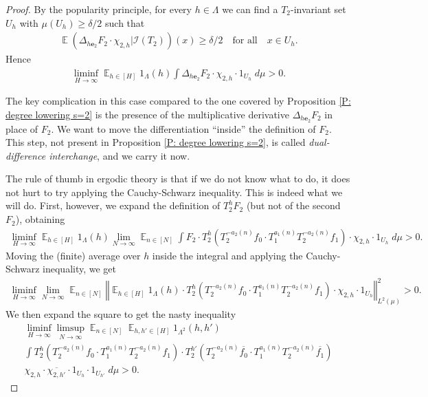 \documentclass[10pt,a4paper]{amsart}
\newcommand{\CI}{{\mathcal I}}
\DeclareMathOperator*{\E}{\mathbb{E}}
\newcommand{\be}{{\mathbf{e}}}
\newcommand{\brac}[1]{\mathopen{}\left( #1 \mathclose{}\right)}
\newcommand{\norm}[1]{\left\Vert #1\right\Vert}
\begin{document}
\begin{proof}
    By the popularity principle, for every $h\in\Lambda$ we can find a $T_2$-invariant set $U_h$ with $\mu(U_h)\geq \delta/2$ such that
    \begin{align}\label{E: lower bound on U s=3}
        \E(\Delta_{h\be_2} F_2\cdot {\chi_{2,h}}|\CI(T_2))(x) \geq \delta/2 \quad \textrm{for all}\quad x\in U_h.
    \end{align}
    Hence
    \begin{align}\label{E: original positivity s=3}
        \liminf_{H\to\infty}\E_{h\in[H]} 1_\Lambda(h)\int \Delta_{h\be_2} F_2 \cdot {\chi_{2,h}}\cdot 1_{U_h}\; d\mu > 0.
    \end{align}

    The key complication in this case compared to the one covered by Proposition \ref{P: degree lowering s=2} is the presence of the multiplicative derivative $\Delta_{h\be_2} F_2$ in place of $F_2$. We want to move the differentiation ``inside'' the definition of $F_2$. This step, not present in Proposition \ref{P: degree lowering s=2}, is called \emph{dual-difference interchange}, and we carry it now. 
    
    The rule of thumb in ergodic theory is that if we do not know what to do, it does not hurt to try applying the Cauchy-Schwarz inequality. This is indeed what we will do. First, however, we expand the definition of $T_2^h F_2$ (but not of the second $F_2$), obtaining
    \begin{align*}
        \liminf_{H\to\infty}\E_{h\in[H]}1_\Lambda(h) \lim_{N\to\infty}\E_{n\in[N]}\int F_2\cdot T_2^h\brac{T_2^{-a_2(n)}{f_0}\cdot T_1^{a_1(n)}T_2^{-a_2(n)}{f_1}}\cdot {\chi_{2,h}}\cdot 1_{U_h}\; d\mu > 0.
    \end{align*}
    Moving the (finite) average over $h$ inside the integral and applying the Cauchy-Schwarz inequality, we get
        \begin{align*}
        \liminf_{H\to\infty} \lim_{N\to\infty}\E_{n\in[N]}\norm{\E_{h\in[H]}1_\Lambda(h) \cdot T_2^h\brac{T_2^{-a_2(n)}{f_0}\cdot T_1^{a_1(n)}T_2^{-a_2(n)}{f_1}}\cdot {\chi_{2,h}}\cdot 1_{U_h}}_{L^2(\mu)}^2> 0.
    \end{align*}
    We then expand the square to get the nasty inequality
    \begin{multline*}
         \liminf_{H\to\infty} \limsup_{N\to\infty}\E_{n\in[N]}\E_{h,h'\in[H]}1_{\Lambda^2}(h,h')\\
         \int T_2^h\brac{T_2^{-a_2(n)}{f_0}\cdot T_1^{a_1(n)}T_2^{-a_2(n)}{f_1}}\cdot T_2^{h'}\brac{T_2^{-a_2(n)}\overline{f_0}\cdot T_1^{a_1(n)}T_2^{-a_2(n)}\overline{f_1}}\\ \chi_{2,h}\cdot\overline{\chi_{2,h'}}\cdot 1_{U_h}\cdot 1_{U_{h'}}\; d\mu > 0.
    \end{multline*}


\end{proof}
\end{document}
